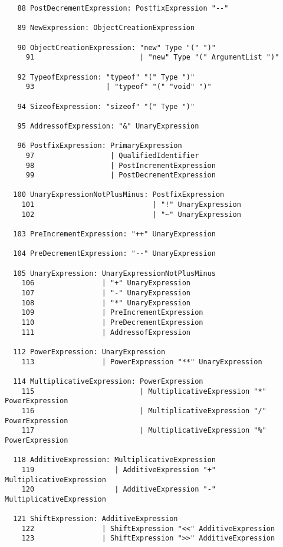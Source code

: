 \begin{espacosimples}
\begin{scriptsize}
\begin{lstlisting}
   88 PostDecrementExpression: PostfixExpression "--"
  
   89 NewExpression: ObjectCreationExpression
  
   90 ObjectCreationExpression: "new" Type "(" ")"
     91                         | "new" Type "(" ArgumentList ")"
  
   92 TypeofExpression: "typeof" "(" Type ")"
     93                 | "typeof" "(" "void" ")"
  
   94 SizeofExpression: "sizeof" "(" Type ")"
  
   95 AddressofExpression: "&" UnaryExpression
  
   96 PostfixExpression: PrimaryExpression
     97                  | QualifiedIdentifier
     98                  | PostIncrementExpression
     99                  | PostDecrementExpression
  
  100 UnaryExpressionNotPlusMinus: PostfixExpression
    101                            | "!" UnaryExpression
    102                            | "~" UnaryExpression
  
  103 PreIncrementExpression: "++" UnaryExpression
  
  104 PreDecrementExpression: "--" UnaryExpression
  
  105 UnaryExpression: UnaryExpressionNotPlusMinus
    106                | "+" UnaryExpression
    107                | "-" UnaryExpression
    108                | "*" UnaryExpression
    109                | PreIncrementExpression
    110                | PreDecrementExpression
    111                | AddressofExpression
  
  112 PowerExpression: UnaryExpression
    113                | PowerExpression "**" UnaryExpression
  
  114 MultiplicativeExpression: PowerExpression
    115                         | MultiplicativeExpression "*" PowerExpression
    116                         | MultiplicativeExpression "/" PowerExpression
    117                         | MultiplicativeExpression "%" PowerExpression
  
  118 AdditiveExpression: MultiplicativeExpression
    119                   | AdditiveExpression "+" MultiplicativeExpression
    120                   | AdditiveExpression "-" MultiplicativeExpression
  
  121 ShiftExpression: AdditiveExpression
    122                | ShiftExpression "<<" AdditiveExpression
    123                | ShiftExpression ">>" AdditiveExpression
  

\end{lstlisting}
\end{scriptsize}
\end{espacosimples}
